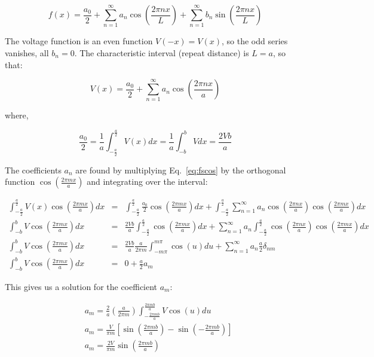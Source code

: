 \documentclass[12pt]{article}
\begin{document}
\begin{flushleft}
\begin{equation*}
f(x) = \frac{a_{0}}{2} + \sum_{n=1}^{\infty} a_{n}\cos{\left(\frac{2\pi nx}{L}\right)} + \sum_{n=1}^{\infty} b_{n}\sin{\left(\frac{2\pi n x}{L}\right)}
\end{equation*}

The voltage function is an even function $V(-x)=V(x)$, so the odd series vanishes, all $b_{n}=0$.  The characteristic interval (repeat distance) is $L=a$, so that:

\begin{equation}
V(x) = \frac{a_{0}}{2} + \sum_{n=1}^{\infty} a_{n}\cos{\left(\frac{2\pi nx}{a}\right)}
\label{eq:fscos}
\end{equation}

where,

\[
\frac{a_{0}}{2} = \frac{1}{a}\int_{-\frac{a}{2}}^{\frac{a}{2}} V(x) dx = \frac{1}{a}\int_{-b}^{b} V dx = \frac{2Vb}{a}
\]

The coefficients $a_{n}$ are found by multiplying Eq.~\ref{eq:fscos} by the orthogonal function $\cos{(\frac{2\pi m x}{a})}$ and integrating over the interval:

\begin{eqnarray*}
\int_{-\frac{a}{2}}^{\frac{a}{2}} V(x)\cos{(\frac{2\pi m x}{a})} dx & = & \int_{-\frac{a}{2}}^{\frac{a}{2}} \frac{a_{0}}{2}\cos{(\frac{2\pi m x}{a})}dx + \int_{-\frac{a}{2}}^{\frac{a}{2}}\sum_{n=1}^{\infty} a_{n}\cos{\left(\frac{2\pi nx}{a}\right)}\cos{(\frac{2\pi m x}{a})} dx\\
\int_{-b}^{b} V\cos{(\frac{2\pi m x}{a})} dx & = & \frac{2Vb}{a}\int_{-\frac{a}{2}}^{\frac{a}{2}} \cos{(\frac{2\pi m x}{a})}dx + \sum_{n=1}^{\infty} a_{n}\int_{-\frac{a}{2}}^{\frac{a}{2}}\cos{\left(\frac{2\pi nx}{a}\right)}\cos{(\frac{2\pi m x}{a})} dx\\
\int_{-b}^{b} V\cos{(\frac{2\pi m x}{a})} dx & = & \frac{2Vb}{a}\frac{a}{2\pi m}\int_{-m\pi}^{m\pi} \cos{(u)}du + \sum_{n=1}^{\infty} a_{n}\frac{a}{2}\delta_{nm}\\
\int_{-b}^{b} V\cos{(\frac{2\pi m x}{a})} dx & = & 0 + \frac{a}{2} a_{m}
\end{eqnarray*}

This gives us a solution for the coefficient $a_{m}$:

\begin{equation*}
\begin{aligned}
& a_{m} = \frac{2}{a} \left( \frac{a}{2\pi m} \right) \int_{-\frac{2\pi m b}{a}}^{\frac{2\pi m b}{a}} V\cos{(u)} du \\
& a_{m} = \frac{V}{\pi m}  \left[ \sin{\left(\frac{2\pi m b}{a}\right)} - \sin{\left(-\frac{2\pi m b}{a}\right)} \right]  \\
& a_{m} = \frac{2V}{\pi m} \sin{\left(\frac{2\pi m b}{a}\right)}
\end{aligned}
\end{equation*} 


\end{flushleft}
\end{document}
